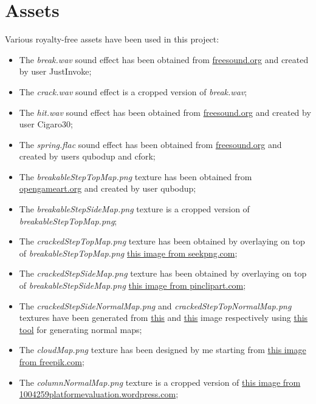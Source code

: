 \documentclass[12pt]{article}
\begin{document}
\section{Assets}
Various royalty-free assets have been used in this project: 
\begin{itemize}
\item The \textit{break.wav} sound effect has been obtained from \href{https://freesound.org/people/JustInvoke/sounds/446119/}{freesound.org} and created by user JustInvoke;
\item The \textit{crack.wav} sound effect is a cropped version of \textit{break.wav};
\item The \textit{hit.wav} sound effect has been obtained from \href{https://freesound.org/people/Cigaro30/sounds/420936/}{freesound.org} and created by user Cigaro30;
\item The \textit{spring.flac} sound effect has been obtained from \href{https://freesound.org/people/qubodup/sounds/172660/}{freesound.org} and created by users qubodup and cfork;
\item The \textit{breakableStepTopMap.png} texture has been obtained from \href{https://opengameart.org/content/light-wood-1024x1024}{opengameart.org} and created by user qubodup;
\item The \textit{breakableStepSideMap.png} texture is a cropped version of \textit{breakableStepTopMap.png};
\item The \textit{crackedStepTopMap.png} texture has been obtained by overlaying on top of \textit{breakableStepTopMap.png} \href{https://www.seekpng.com/ima/u2e6o0w7w7e6q8o0/}{this image from seekpng.com};
\item The \textit{crackedStepSideMap.png} texture has been obtained by overlaying on top of \textit{breakableStepSideMap.png} \href{https://www.pinclipart.com/maxpin/iiiJoi/}{this image from pinclipart.com};
\item The \textit{crackedStepSideNormalMap.png} and \textit{crackedStepTopNormalMap.png} textures have been generated from \href{https://www.pinclipart.com/maxpin/iiiJoi/}{this} and \href{https://www.seekpng.com/ima/u2e6o0w7w7e6q8o0/}{this} image respectively using \href{https://cpetry.github.io/NormalMap-Online/}{this tool} for generating normal maps;
\item The \textit{cloudMap.png} texture has been designed by me starting from \href{https://www.freepik.com/free-vector/clouds-background-flat-design_2040928.htm#page=1&query=cloud&position=6}{this image from freepik.com};
\item The \textit{columnNormalMap.png} texture is a cropped version of \href{https://1004259platformevaluation.files.wordpress.com/2011/12/pillarnormals.png}{this image from 1004259platformevaluation.wordpress.com};

\end{itemize}
\end{document}
